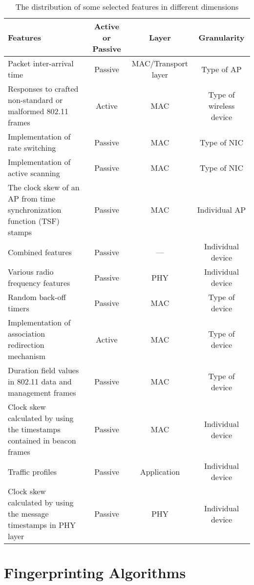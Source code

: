 \documentclass[journal,draftcls,onecolumn,11pt]{IEEEtran}
\begin{document}
\begin{table}
\centering
\caption{The distribution of some selected features in different dimensions}
\label{big table}
\begin{tabularx}{\textwidth}{|X|c|c|c|}
\hline
\textbf{Features} & \textbf{Active or Passive} & \textbf{Layer}  & \textbf{Granularity} \\
\hline
Packet inter-arrival time~\cite{Gao} & Passive & MAC/Transport layer & Type of AP \\
\hline
Responses to crafted non-standard or malformed 802.11 frames\cite{Bratus2008} & Active & MAC & Type of wireless device \\
\hline
Implementation of rate switching\cite{Corbett2006a,Corbett2008} & Passive & MAC & Type of NIC \\
\hline
Implementation of active scanning\cite{Corbett2006,Desmond2008,Franklin,Corbett2008a} & Passive & MAC & Type of NIC \\
\hline
The clock skew of an AP from time synchronization function (TSF) stamps \cite{Jana,Arackaparambil2006} & Passive & MAC & Individual AP \\
\hline
Combined features\cite{Chen,Scanlon2010} & Passive & --- & Individual device \\
\hline
Various radio frequency features\cite{Remley,Brik2008,Sheng,Ureten2007,Dolatshahi2010,Hall2005,Polak2011} & Passive & PHY & Individual device \\
\hline
Random back-off timers\cite{Neumann} & Passive & MAC & Type of device \\
\hline
Implementation of association redirection mechanism\cite{Neumann} & Active & MAC & Type of device \\
\hline
Duration field values in 802.11 data and management frames\cite{Neumann} & Passive & MAC & Type of device \\
\hline
Clock skew calculated by using the timestamps contained in beacon frames\cite{Neumann} & Passive & MAC & Individual device \\
\hline
Traffic profiles & Passive & Application & Individual device \\
\hline
Clock skew calculated by using the message timestamps in PHY layer & Passive & PHY & Individual device \\
\hline
\end{tabularx}
\end{table}

\section{Fingerprinting Algorithms}
\label{sect:algo}
\end{document}
